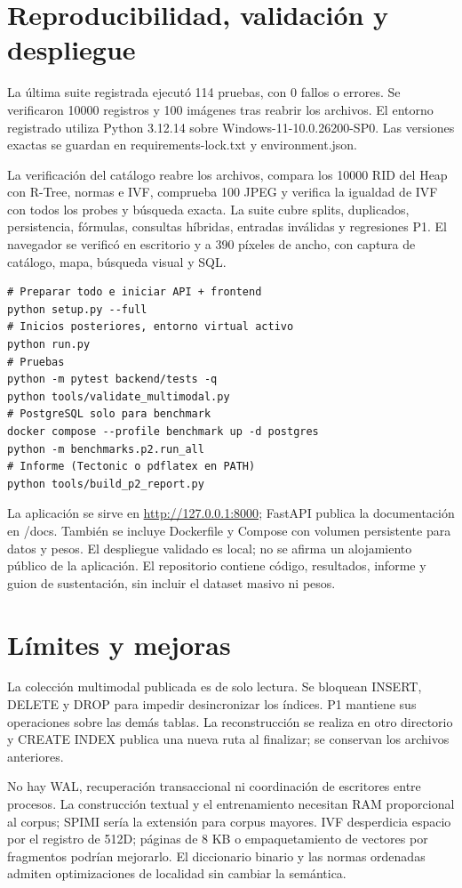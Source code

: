\documentclass[11pt,a4paper]{article}
\begin{document}
\clearpage
\section{Reproducibilidad, validación y despliegue}
La última suite registrada ejecutó 114 pruebas, con 0 fallos o errores. Se verificaron 10000 registros y 100 imágenes tras reabrir los archivos. El entorno registrado utiliza Python 3.12.14 sobre Windows-11-10.0.26200-SP0. Las versiones exactas se guardan en requirements-lock.txt y environment.json.

La verificación del catálogo reabre los archivos, compara los 10000 RID del Heap con R-Tree, normas e IVF, comprueba 100 JPEG y verifica la igualdad de IVF con todos los probes y búsqueda exacta. La suite cubre splits, duplicados, persistencia, fórmulas, consultas híbridas, entradas inválidas y regresiones P1. El navegador se verificó en escritorio y a 390 píxeles de ancho, con captura de catálogo, mapa, búsqueda visual y SQL.

\begin{lstlisting}
# Preparar todo e iniciar API + frontend
python setup.py --full
# Inicios posteriores, entorno virtual activo
python run.py
# Pruebas
python -m pytest backend/tests -q
python tools/validate_multimodal.py
# PostgreSQL solo para benchmark
docker compose --profile benchmark up -d postgres
python -m benchmarks.p2.run_all
# Informe (Tectonic o pdflatex en PATH)
python tools/build_p2_report.py
\end{lstlisting}

La aplicación se sirve en \url{http://127.0.0.1:8000}; FastAPI publica la documentación en /docs. También se incluye Dockerfile y Compose con volumen persistente para datos y pesos. El despliegue validado es local; no se afirma un alojamiento público de la aplicación. El repositorio contiene código, resultados, informe y guion de sustentación, sin incluir el dataset masivo ni pesos.

\section{Límites y mejoras}
La colección multimodal publicada es de solo lectura. Se bloquean INSERT, DELETE y DROP para impedir desincronizar los índices. P1 mantiene sus operaciones sobre las demás tablas. La reconstrucción se realiza en otro directorio y CREATE INDEX publica una nueva ruta al finalizar; se conservan los archivos anteriores.

No hay WAL, recuperación transaccional ni coordinación de escritores entre procesos. La construcción textual y el entrenamiento necesitan RAM proporcional al corpus; SPIMI sería la extensión para corpus mayores. IVF desperdicia espacio por el registro de 512D; páginas de 8 KB o empaquetamiento de vectores por fragmentos podrían mejorarlo. El diccionario binario y las normas ordenadas admiten optimizaciones de localidad sin cambiar la semántica.
\end{document}
